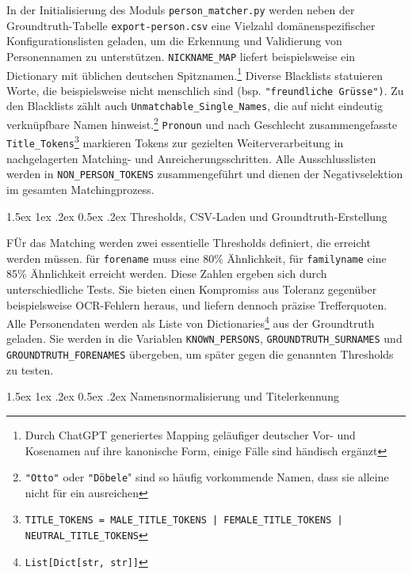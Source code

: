 \documentclass[12pt, a4paper, ngerman, bidi=default]{article}
\makeatletter
\newcommand{\code}[1]{\colorbox{VeryLightGray}{\texttt{#1}}} %
\let\oldparagraph\paragraph%
\renewcommand{\paragraph}{
    \@ifstar%
      \xxxParagraphStar%
      \xxxParagraphNoStar%
 }
\newcommand{\xxxParagraphStar}[1]{\oldparagraph*{#1}\mbox{}}
\newcommand{\xxxParagraphNoStar}[1]{\oldparagraph{#1}\mbox{}}
\renewcommand\paragraph{\@startsection{paragraph}{4}{0em}%
  {1.5ex \@plus1ex \@minus.2ex}%
  {0.5ex \@plus.2ex}%
  {\normalfont\normalsize\bfseries\itshape}}
\makeatother
\begin{document}
In der Initialisierung des Moduls \code{person\_matcher.py} werden neben der Groundtruth-Tabelle \texttt{export-person.csv} eine Vielzahl domänenspezifischer Konfigurationslisten geladen, um die Erkennung und Validierung von Personennamen zu unterstützen.
\code{NICKNAME\_MAP} liefert beispielsweise ein Dictionary mit üblichen deutschen Spitznamen.\footnote{Durch ChatGPT generiertes Mapping geläufiger deutscher Vor- und Kosenamen auf ihre kanonische Form, einige Fälle sind händisch ergänzt}
Diverse Blacklists statuieren Worte, die beispielsweise nicht menschlich sind (bsp. \texttt{"freundliche Grüsse")}. Zu den Blacklists zählt auch \code{Unmatchable\_Single\_Names}, die auf nicht eindeutig verknüpfbare Namen hinweist.\footnote{\texttt{"Otto"} oder \texttt{"Döbele}" sind so häufig vorkommende Namen, dass sie alleine nicht für ein  ausreichen} \code{Pronoun} und nach Geschlecht zusammengefasste \code{Title\_Tokens}\footnote{\code{TITLE\_TOKENS = MALE\_TITLE\_TOKENS | FEMALE\_TITLE\_TOKENS | NEUTRAL\_TITLE\_TOKENS}} markieren Tokens zur gezielten Weiterverarbeitung in nachgelagerten Matching- und Anreicherungsschritten. Alle Ausschlusslisten werden in \code{NON\_PERSON\_TOKENS} zusammengeführt und dienen der Negativselektion im gesamten Matchingprozess. 

\paragraph{Thresholds, CSV-Laden und Groundtruth-Erstellung}\label{paragraph:Pers_match/Threstholds}

FÜr das Matching werden zwei essentielle Thresholds definiert, die erreicht werden müssen. für \code{forename} muss eine 80\%  Ähnlichkeit, für \code{familyname} eine 85\% Ähnlichkeit erreicht werden. Diese Zahlen ergeben sich durch unterschiedliche Tests. Sie bieten einen Kompromiss aus Toleranz gegenüber beispielsweise OCR-Fehlern heraus, und liefern dennoch präzise Trefferquoten. Alle Personendaten werden als Liste von Dictionaries\footnote{\code{List[Dict[str, str]]}} aus der Groundtruth geladen. Sie werden in die Variablen \code{KNOWN\_PERSONS}, \code{GROUNDTRUTH\_SURNAMES} und \code{GROUNDTRUTH\_FORENAMES} übergeben, um später gegen die genannten Thresholds zu testen.

\paragraph{ Namensnormalisierung und Titelerkennung}\label{paragraph:Pers_match/Normalisierung}
\end{document}
